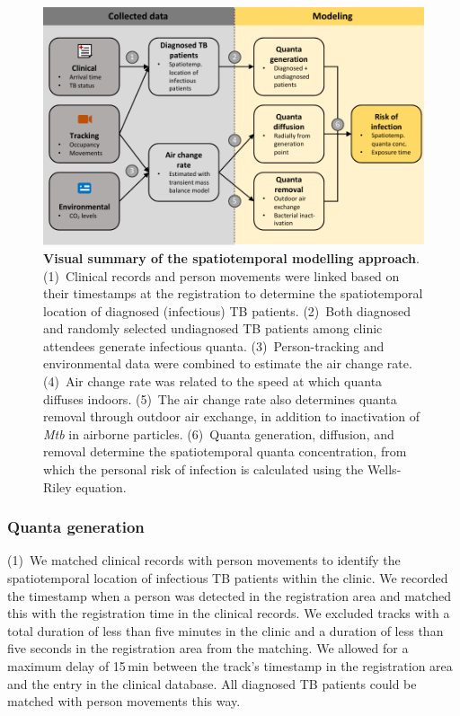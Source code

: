 \documentclass[fleqn,11pt]{wlscirep}
\begin{document}
\begin{figure}[!htpb]
    \centering
    \includegraphics{doc/model-flow-chart.pdf}
    \caption{\textbf{Visual summary of the spatiotemporal modelling approach}. (1)~Clinical records and person movements were linked based on their timestamps at the registration to determine the spatiotemporal location of diagnosed (infectious) TB patients. (2)~Both diagnosed and randomly selected undiagnosed TB patients among clinic attendees generate infectious quanta. (3)~Person-tracking and environmental data were combined to estimate the air change rate. (4)~Air change rate was related to the speed at which quanta diffuses indoors. (5)~The air change rate also determines quanta removal through outdoor air exchange, in addition to inactivation of \emph{Mtb} in airborne particles. (6)~Quanta generation, diffusion, and removal determine the spatiotemporal quanta concentration, from which the personal risk of infection is calculated using the Wells-Riley equation.}
    \label{fig:modeling-flow}
\end{figure}

\subsubsection*{Quanta generation}

(1)~We matched clinical records with person movements to identify the spatiotemporal location of infectious TB patients within the clinic. We recorded the timestamp when a person was detected in the registration area and matched this with the registration time in the clinical records. We excluded tracks with a total duration of less than five minutes in the clinic and a duration of less than five seconds in the registration area from the matching. We allowed for a maximum delay of 15\,min between the track's timestamp in the registration area and the entry in the clinical database. All diagnosed TB patients could be matched with person movements this way. 
\end{document}
